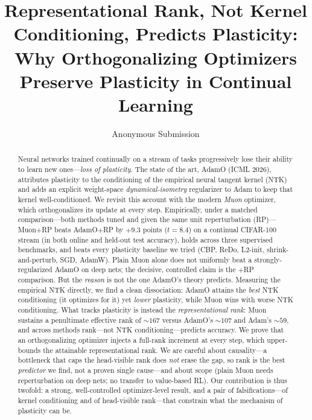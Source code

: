 \documentclass[letterpaper]{article} %
\title{Representational Rank, Not Kernel Conditioning, Predicts Plasticity:\\ Why Orthogonalizing Optimizers Preserve Plasticity in Continual Learning}
\author{Anonymous Submission}
\begin{document}
\maketitle

\begin{abstract}
Neural networks trained continually on a stream of tasks progressively lose their ability to learn new ones---\emph{loss of plasticity}. The state of the art, AdamO (ICML 2026), attributes plasticity to the conditioning of the empirical neural tangent kernel (NTK) and adds an explicit weight-space \emph{dynamical-isometry} regularizer to Adam to keep that kernel well-conditioned. We revisit this account with the modern \emph{Muon} optimizer, which orthogonalizes its update at every step. Empirically, under a matched comparison---both methods tuned and given the same unit reperturbation (RP)---Muon$+$RP beats AdamO$+$RP by $+9.3$ points ($t{=}8.4$) on a continual CIFAR-100 stream (in both online and held-out test accuracy), holds across three supervised benchmarks, and beats every plasticity baseline we tried (CBP, ReDo, L2-init, shrink-and-perturb, SGD, AdamW). Plain Muon alone does not uniformly beat a strongly-regularized AdamO on deep nets; the decisive, controlled claim is the $+$RP comparison. But the \emph{reason} is not the one AdamO's theory predicts. Measuring the empirical NTK directly, we find a clean dissociation: AdamO attains the \emph{best} NTK conditioning (it optimizes for it) yet \emph{lower} plasticity, while Muon wins with worse NTK conditioning. What tracks plasticity is instead the \emph{representational rank}: Muon sustains a penultimate effective rank of ${\sim}167$ versus AdamO's ${\sim}107$ and Adam's ${\sim}59$, and across methods rank---not NTK conditioning---predicts accuracy. We prove that an orthogonalizing optimizer injects a full-rank increment at every step, which upper-bounds the attainable representational rank. We are careful about causality---a bottleneck that caps the head-visible rank does \emph{not} erase the gap, so rank is the best \emph{predictor} we find, not a proven single cause---and about scope (plain Muon needs reperturbation on deep nets; no transfer to value-based RL). Our contribution is thus twofold: a strong, well-controlled optimizer-level result, and a pair of falsifications---of kernel conditioning and of head-visible rank---that constrain what the mechanism of plasticity can be.
\end{abstract}
\end{document}
